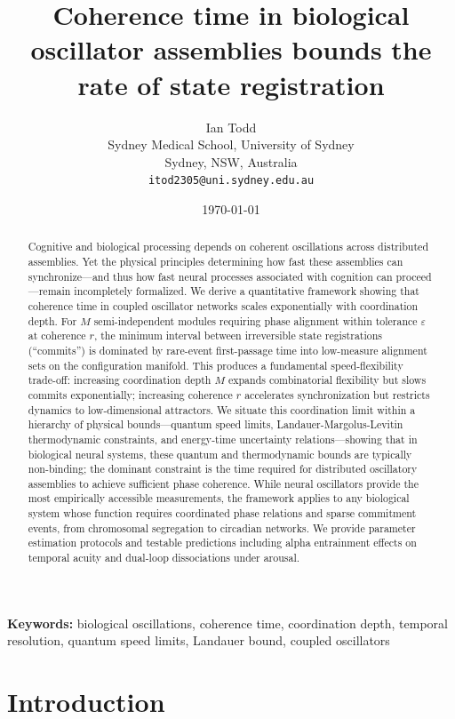 \documentclass[12pt]{article}
\title{Coherence time in biological oscillator assemblies bounds the rate of state registration}
\author{Ian Todd\\
Sydney Medical School, University of Sydney\\
Sydney, NSW, Australia\\
\texttt{itod2305@uni.sydney.edu.au}}
\date{\today}
\begin{document}
\maketitle

\begin{abstract}
Cognitive and biological processing depends on coherent oscillations across distributed assemblies. Yet the physical principles determining how fast these assemblies can synchronize---and thus how fast neural processes associated with cognition can proceed---remain incompletely formalized. We derive a quantitative framework showing that coherence time in coupled oscillator networks scales exponentially with coordination depth. For $M$ semi-independent modules requiring phase alignment within tolerance $\varepsilon$ at coherence $r$, the minimum interval between irreversible state registrations (``commits'') is dominated by rare-event first-passage time into low-measure alignment sets on the configuration manifold. This produces a fundamental speed-flexibility trade-off: increasing coordination depth $M$ expands combinatorial flexibility but slows commits exponentially; increasing coherence $r$ accelerates synchronization but restricts dynamics to low-dimensional attractors. We situate this coordination limit within a hierarchy of physical bounds---quantum speed limits, Landauer-Margolus-Levitin thermodynamic constraints, and energy-time uncertainty relations---showing that in biological neural systems, these quantum and thermodynamic bounds are typically non-binding; the dominant constraint is the time required for distributed oscillatory assemblies to achieve sufficient phase coherence. While neural oscillators provide the most empirically accessible measurements, the framework applies to any biological system whose function requires coordinated phase relations and sparse commitment events, from chromosomal segregation to circadian networks. We provide parameter estimation protocols and testable predictions including alpha entrainment effects on temporal acuity and dual-loop dissociations under arousal.
\end{abstract}

\textbf{Keywords:} biological oscillations, coherence time, coordination depth, temporal resolution, quantum speed limits, Landauer bound, coupled oscillators

\section{Introduction}
\end{document}
